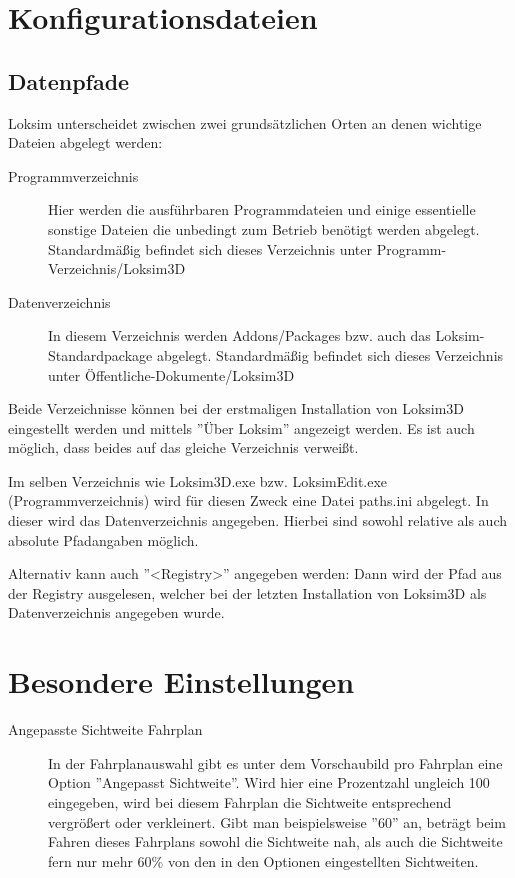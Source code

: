 \section{Konfigurationsdateien}
\subsection{Datenpfade}
\label{sec:sim-optionen-paths}
Loksim unterscheidet zwischen zwei grundsätzlichen Orten an denen wichtige Dateien abgelegt werden:
\begin{description}
\item[Programmverzeichnis] Hier werden die ausführbaren Programmdateien und einige essentielle sonstige Dateien die unbedingt zum Betrieb benötigt werden abgelegt. Standardmäßig befindet sich dieses Verzeichnis unter Programm-Verzeichnis/Loksim3D
\item[Datenverzeichnis] In diesem Verzeichnis werden Addons/Packages bzw. auch das Loksim-Standardpackage abgelegt. Standardmäßig befindet sich dieses Verzeichnis unter Öffentliche-Dokumente/Loksim3D
\end{description}
Beide Verzeichnisse können bei der erstmaligen Installation von Loksim3D eingestellt werden und mittels ''Über Loksim'' angezeigt werden. Es ist auch möglich, dass beides auf das gleiche Verzeichnis verweißt.

Im selben Verzeichnis wie Loksim3D.exe bzw. LoksimEdit.exe (Programmverzeichnis) wird für diesen Zweck eine Datei paths.ini abgelegt. In dieser wird das Datenverzeichnis angegeben. Hierbei sind sowohl relative als auch absolute Pfadangaben möglich.

Alternativ kann auch ''<Registry>'' angegeben werden: Dann wird der Pfad aus der Registry ausgelesen, welcher bei der letzten Installation von Loksim3D als Datenverzeichnis angegeben wurde.

\section{Besondere Einstellungen}
\label{sec:sim-optionen-special}
\begin{description}
\item[Angepasste Sichtweite Fahrplan] In der Fahrplanauswahl gibt es unter dem Vorschaubild pro Fahrplan eine Option ''Angepasst Sichtweite''. Wird hier eine Prozentzahl ungleich 100 eingegeben, wird bei diesem Fahrplan die Sichtweite entsprechend vergrößert oder verkleinert. Gibt man beispielsweise ''60'' an, beträgt beim Fahren dieses Fahrplans sowohl die Sichtweite nah, als auch die Sichtweite fern nur mehr 60\% von den in den Optionen eingestellten Sichtweiten.
\end{description}
